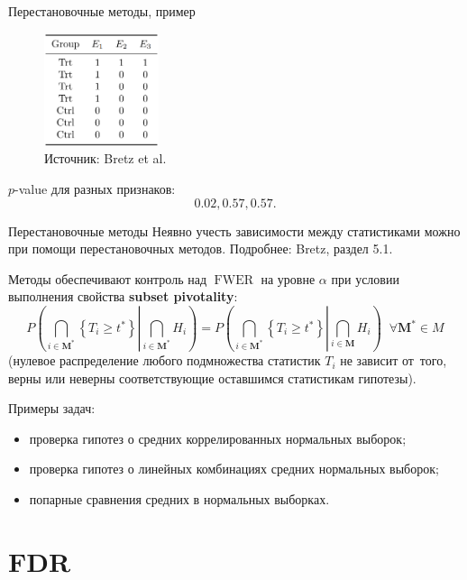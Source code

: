 \documentclass[9pt,pdf,utf8,hyperref={unicode},aspectratio=169]{beamer}
\renewcommand{\geq}{\geqslant}
\DeclareMathOperator{\FWER}{FWER}
\begin{document}
\begin{frame}{Перестановочные методы, пример}
\begin{figure}
\includegraphics[width=0.3\textwidth]{perm.png}
\caption*{\footnotesize{Источник: Bretz et al.}}
\end{figure}

$p$-value для разных признаков:
\[
    0.02, 0.57, 0.57.
\]



\end{frame}

\begin{frame}{Перестановочные методы}
    Неявно учесть зависимости между статистиками можно при помощи перестановочных методов. Подробнее: Bretz, раздел 5.1.

    \bigskip

     Методы обеспечивают контроль над $\FWER$ на уровне $\alpha$ при условии выполнения свойства \textbf{subset pivotality}:
     $$P\left(\left. \bigcap\limits_{i\in \mathbf{M}^*} \left\{T_i\geq t^* \right\} \right| \bigcap\limits_{i\in \mathbf{M}^*} H_i\right) = P\left(\left. \bigcap\limits_{i\in \mathbf{M}^*} \left\{T_i\geq t^* \right\} \right| \bigcap\limits_{i\in \mathbf{M}} H_i\right) \;\; \forall \mathbf{M}^* \in M$$
     (нулевое распределение любого подмножества статистик $T_i$ не зависит от~того, верны или неверны соответствующие оставшимся статистикам гипотезы).
     
     \bigskip
     
     Примеры задач:
     \begin{itemize}
	     \item проверка гипотез о средних коррелированных нормальных выборок;
	     \item проверка гипотез о линейных комбинациях средних нормальных выборок;
	     \item попарные сравнения средних в нормальных выборках.
     \end{itemize}
\end{frame}


\section{FDR}
\end{document}
